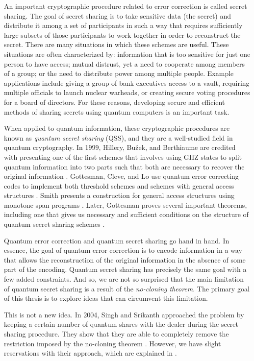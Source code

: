 An important cryptographic procedure related to error correction is called secret sharing. The goal of secret sharing is to take sensitive data (the secret) and distribute it among a set of participants in such a way that requires sufficiently large subsets of those participants to work together in order to reconstruct the secret. There are many situations in which these schemes are useful. These situations are often characterized by: information that is too sensitive for just one person to have access; mutual distrust, yet a need to cooperate among members of a group; or the need to distribute power among multiple people. Example applications include giving a group of bank executives access to a vault, requiring multiple officials to launch nuclear warheads, or creating secure voting procedures for a board of directors. For these reasons, developing secure and efficient methods of sharing secrets using quantum computers is an important task. 

When applied to quantum information, these cryptographic procedures are known as \textit{quantum secret sharing} (QSS), and they are a well-studied field in quantum cryptography. In 1999, Hillery, Bu\u{z}ek, and Berthiaume are credited with presenting one of the first schemes that involves using GHZ states to split quantum information into two parts such that both are necessary to recover the original information \cite{hillery_quantum_1999}. Gottesman, Cleve, and Lo use quantum error correcting codes to implement both threshold schemes and schemes with general access structures \cite{cleve_how_1999}. Smith presents a construction for general access structures using monotone span programs \cite{smith_quantum_2000}. Later, Gottesman proves several important theorems, including one that gives us necessary and sufficient conditions on the structure of quantum secret sharing schemes \cite{gottesman_theory_2000}.

Quantum error correction and quantum secret sharing go hand in hand. In essence, the goal of quantum error correction is to encode information in a way that allows the reconstruction of the original information in the absence of some part of the encoding. Quantum secret sharing has precisely the same goal with a few added constraints. And so, we are not so surprised that the main limitation of quantum secret sharing is a result of the \textit{no-cloning theorem}. The primary goal of this thesis is to explore ideas that can circumvent this limitation.

This is not a new idea. In 2004, Singh and Srikanth approached the problem by keeping a certain number of quantum shares with the dealer during the secret sharing procedure. They show that they are able to completely remove the restriction imposed by the no-cloning theorem \cite{singh_assisted_2004}. However, we have slight reservations with their approach, which are explained in . 

